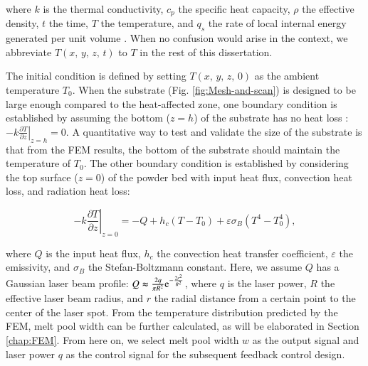 \documentclass [11pt, proquest] {uwthesis}[2020/02/24]
\begin{document}
\noindent where $k$ is the thermal conductivity, $c_{p}$ the specific
heat capacity, $\rho$ the effective density, $t$ the time, $T$
the temperature, and $q_{s}$ the rate of local internal energy generated
per unit volume \cite{kannatey2009principles}. When no confusion
would arise in the context, we abbreviate $T(x,\,y,\,z,\,t)$ to $T$
in the rest of this dissertation.

The initial condition is defined by setting $T(x,\,y,\,z,\,0)$ as
the ambient temperature $T_{0}$. When the substrate (Fig. \ref{fig:Mesh-and-scan})
is designed to be large enough compared to the heat-affected zone,
one boundary condition is established by assuming the bottom ($z=h$)
of the substrate has no heat loss \cite{masoomi2017laser,hussein2013finite,foroozmehr2016finite}:
$\left.-k\frac{\partial T}{\partial z}\right\vert _{z=h}=0$. A quantitative
way to test and validate the size of the substrate is that from the
FEM results, the bottom of the substrate should maintain the temperature
of $T_{0}$. The other boundary condition is established by considering
the top surface ($z=0$) of the powder bed with input heat flux, convection
heat loss, and radiation heat loss:

\begin{equation}
\left.-k\frac{\partial T}{\partial z}\right\vert _{z=0}=-Q+h_{c}(T-T_{0})+\varepsilon\sigma_{B}(T^{4}-T_{0}^{4}),\label{eq:first_one_boundary}
\end{equation}

\noindent where $Q$ is the input heat flux, $h_{c}$ the convection
heat transfer coefficient, $\varepsilon$ the emissivity, and $\sigma_{B}$
the Stefan-Boltzmann constant. Here, we assume $Q$ has a Gaussian
laser beam profile: $Q\thickapprox\frac{2q}{\pi R^{2}}\text{e}^{-\frac{2r^{2}}{R^{2}}}$,
where $q$ is the laser power, $R$ the effective laser beam radius,
and $r$ the radial distance from a certain point to the center of
the laser spot. From the temperature distribution predicted by the
FEM, melt pool width can be further calculated, as will be elaborated
in Section \ref{chap:FEM}. From here on, we select melt pool width
$w$ as the output signal and laser power $q$ as the control signal
for the subsequent feedback control design. 
\end{document}
